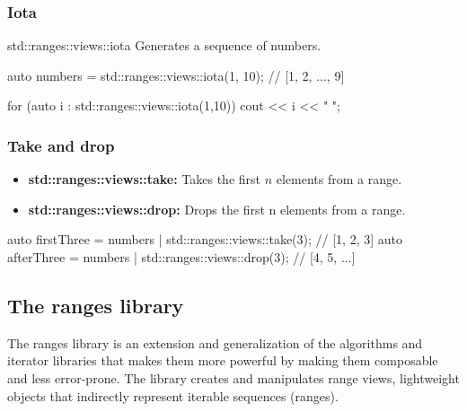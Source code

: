 \documentclass{report}
\begin{document}
         \bigbreak \noindent 
         \subsubsection{Iota}
         \bigbreak \noindent 
         std::ranges::views::iota Generates a sequence of numbers.
         \bigbreak \noindent 
         \begin{cppcode}
         auto numbers = std::ranges::views::iota(1, 10); // [1, 2, ..., 9]

         for (auto i : std::ranges::views::iota(1,10)) cout << i << " ";
         \end{cppcode}

         \bigbreak \noindent 
         \subsubsection{Take and drop}
         \bigbreak \noindent 
         \begin{itemize}
             \item \textbf{std::ranges::views::take:} Takes the first $n $ elements from a range.
            \item \textbf{std::ranges::views::drop:} Drops the first n elements from a range.
         \end{itemize}
         \bigbreak \noindent 
         \begin{cppcode}
             auto firstThree = numbers | std::ranges::views::take(3); // [1, 2, 3]
             auto afterThree = numbers | std::ranges::views::drop(3); // [4, 5, ...]
         \end{cppcode}

         \bigbreak \noindent 
         \subsection{The ranges library}
         \bigbreak \noindent 
         The ranges library is an extension and generalization of the algorithms and iterator libraries that makes them more powerful by making them composable and less error-prone.
         \bigbreak \noindent 
         The library creates and manipulates range views, lightweight objects that indirectly represent iterable sequences (ranges).

         \bigbreak \noindent 
\end{document}
